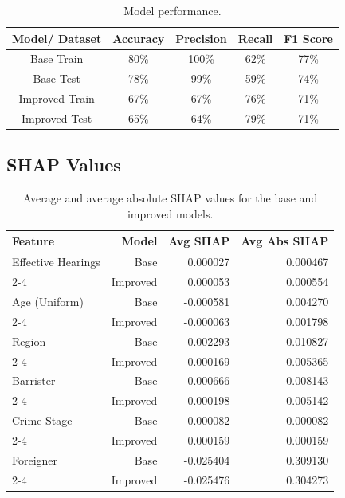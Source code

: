 \documentclass[fleqn,10pt]{wlscirep}
\begin{document}
\begin{table}[!htb]
\centering
\begin{tabular}{|c|c|c|c|c|}
\hline

\textbf{Model/ Dataset} & \textbf{Accuracy} & \textbf{Precision} & \textbf{Recall} & \textbf{F1 Score} \\ \hline
     Base Train &     80\% &     100\% &   62\% &     77\% \\
      Base Test &     78\% &     99\% &   59\% &     74\% \\
Improved Train &     67\% &      67\% &   76\% &     71\% \\
 Improved Test &     65\% &      64\% &   79\% &     71\% \\

\hline
\end{tabular}
\caption{Model performance.}
\end{table}


\subsection{SHAP Values}

\begin{table}[h!]
\centering
\begin{tabular}{|l|r|r|r|}
\hline
\textbf{Feature} & \textbf{Model} & \textbf{Avg SHAP} & \textbf{Avg Abs SHAP}  \\ \hline
Effective Hearings & Base      &  0.000027 &  0.000467  \\ \cline{2-4}
                   & Improved  &  0.000053 &  0.000554 \\ \hline
Age (Uniform)      & Base      & -0.000581 &  0.004270  \\ \cline{2-4}
                   & Improved  & -0.000063 &  0.001798  \\ \hline
Region             & Base      &  0.002293 &  0.010827  \\ \cline{2-4}
                   & Improved  &  0.000169 &  0.005365  \\ \hline
Barrister          & Base      &  0.000666 &  0.008143  \\ \cline{2-4}
                   & Improved  & -0.000198 &  0.005142  \\ \hline
Crime Stage        & Base      &  0.000082 &  0.000082  \\ \cline{2-4}
                   & Improved  &  0.000159 &  0.000159  \\ \hline
Foreigner          & Base      & -0.025404 &  0.309130 \\ \cline{2-4}
                   & Improved  & -0.025476 &  0.304273  \\ \hline
\end{tabular}
\caption{Average and average absolute SHAP values for the base and improved models.}
\label{tab:dt_shap_stats_base_improved_uniform}
\end{table}
\end{document}
